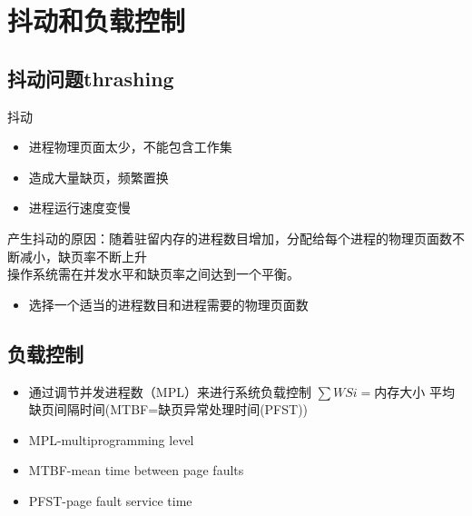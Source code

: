 \section{抖动和负载控制}
\subsection{抖动问题thrashing}
抖动
\begin{itemize}
	\item 进程物理页面太少，不能包含工作集
	\item 造成大量缺页，频繁置换
	\item 进程运行速度变慢
\end{itemize}
产生抖动的原因：随着驻留内存的进程数目增加，分配给每个进程的物理页面数不断减小，缺页率不断上升\\
操作系统需在并发水平和缺页率之间达到一个平衡。
\begin{itemize}
	\item 选择一个适当的进程数目和进程需要的物理页面数
\end{itemize}
\subsection{负载控制}
\begin{itemize}
	\item 通过调节并发进程数（MPL）来进行系统负载控制
	\subitem $\sum WSi=$内存大小
	\subitem 平均缺页间隔时间(MTBF=缺页异常处理时间(PFST))
\end{itemize}
\begin{itemize}
	\item MPL-multiprogramming level
	\item MTBF-mean time between page faults
	\item PFST-page fault service time
\end{itemize}